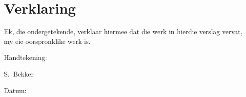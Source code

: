 \chapter{Verklaring}

Ek, die ondergetekende, verklaar hiermee dat die werk in hierdie
verslag vervat, my eie oorspronklike werk is.\par
\vspace{3cm}

\noindent%
\parbox{.5\textwidth}{%
  Handtekening:\quad\dotfill\par
  \hfill S.\ Bekker\hspace{1.2cm}\null}


\vspace{1.5cm}
\noindent%
\parbox{.5\textwidth}{%
  Datum:\quad\dotfill\par}
